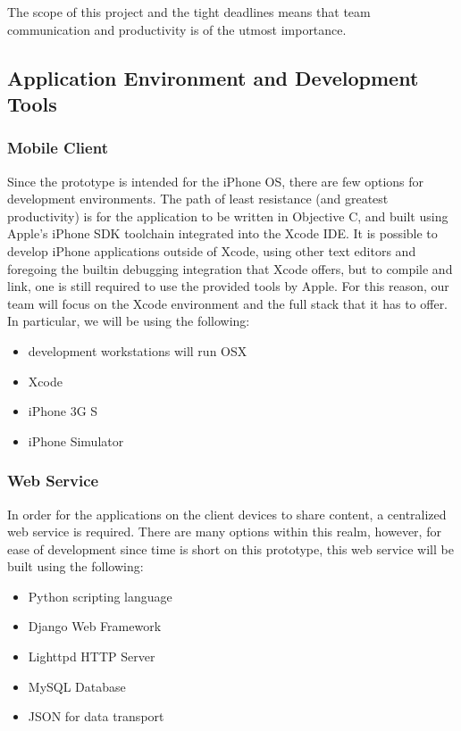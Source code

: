 \documentclass{chi2009}
\begin{document}
The scope of this project and the tight deadlines means that team communication
and productivity is of the utmost importance.

\subsection{ Application Environment and Development Tools }

\subsubsection{ Mobile Client }

Since the prototype is intended for the iPhone OS, there are few options for
development environments.  The path of least resistance (and greatest
productivity) is for the application to be written in Objective C, and built
using Apple's iPhone SDK toolchain integrated into the Xcode IDE.  It is
possible to develop iPhone applications outside of Xcode, using other text
editors and foregoing the builtin debugging integration that Xcode offers, but
to compile and link, one is still required to use the provided tools by Apple.
For this reason, our team will focus on the Xcode environment and the full
stack that it has to offer.  In particular, we will be using the following:

\begin{itemize}
\item development workstations will run OSX
\item Xcode
\item iPhone 3G S
\item iPhone Simulator
\end{itemize}

\subsubsection{ Web Service }

In order for the applications on the client devices to share content, a
centralized web service is required.  There are many options within this realm,
however, for ease of development since time is short on this prototype, this
web service will be built using the following:

\begin{itemize}
\item Python scripting language
\item Django Web Framework
\item Lighttpd HTTP Server
\item MySQL Database
\item JSON for data transport
\end{itemize}
\end{document}
